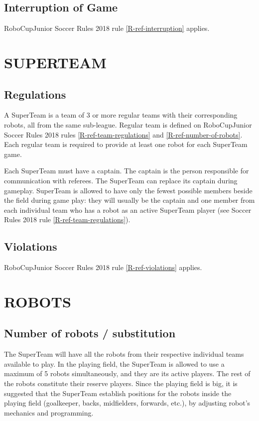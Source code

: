 \documentclass{article}
\begin{document}
\subsection{Interruption of Game \label{ref-014}}

RoboCupJunior Soccer Rules 2018 rule \ref{R-ref-interruption} applies.

\section{SUPERTEAM \label{ref-015}}

\subsection{Regulations \label{ref-016}}

A SuperTeam is a team of 3 or more regular teams with their corresponding
robots, all from the same sub-league. Regular team is defined on RoboCupJunior
Soccer Rules 2018 rules \ref{R-ref-team-regulations} and
\ref{R-ref-number-of-robots}. Each regular team is required to provide at least
one robot for each SuperTeam game.

Each SuperTeam must have a captain. The captain is the person responsible for
communication with referees. The SuperTeam can replace its captain during
gameplay. SuperTeam is allowed to have only the fewest possible members beside
the field during game play: they will usually be the captain and one member
from each individual team who has a robot as an active SuperTeam player (see
Soccer Rules 2018 rule \ref{R-ref-team-regulations}).

\subsection{Violations \label{ref-017}}

RoboCupJunior Soccer Rules 2018 rule \ref{R-ref-violations} applies.

\section{ROBOTS\label{ref-018}}

\subsection{ Number of robots / substitution \label{ref-019}}


The SuperTeam will have all the robots from their respective individual teams
available to play. In the playing field, the SuperTeam is allowed to use a
maximum of 5 robots simultaneously, and they are its active players. The rest
of the robots constitute their reserve players. Since the playing field is big,
it is suggested that the SuperTeam establish positions for the robots inside
the playing field (goalkeeper, backs, midfielders, forwards, etc.), by
adjusting robot's mechanics and programming.
\end{document}
